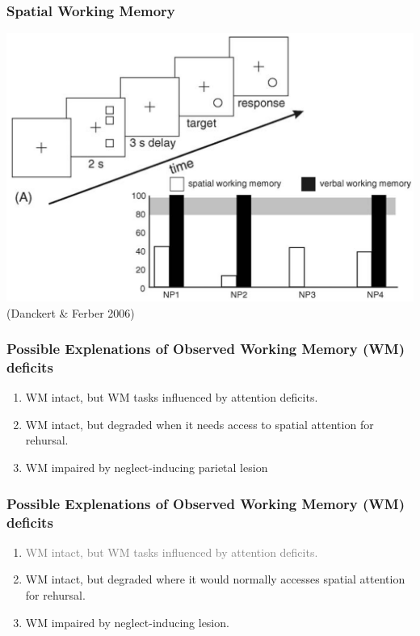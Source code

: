 \documentclass{beamer}
\begin{document}

\begin{frame}
	\frametitle{Possible Explenations of Observed Working Memory (WM) deficits}
	\begin{enumerate}
		\item WM intact, but WM tasks influenced by attention deficits.
		\item WM intact, but degraded when it needs access to spatial attention for rehursal.
		\item WM impaired by neglect-inducing parietal lesion
	\end{enumerate}
\end{frame}

\begin{frame}
	\frametitle{Possible Explenations of Observed Working Memory (WM) deficits}
	\begin{enumerate}
		\item \textcolor{gray}{WM intact, but WM tasks influenced by attention deficits.}
		\item WM intact, but degraded where it would normally accesses spatial attention for rehursal.
		\item WM impaired by neglect-inducing lesion.
	\end{enumerate}
\end{frame}

\end{document}
